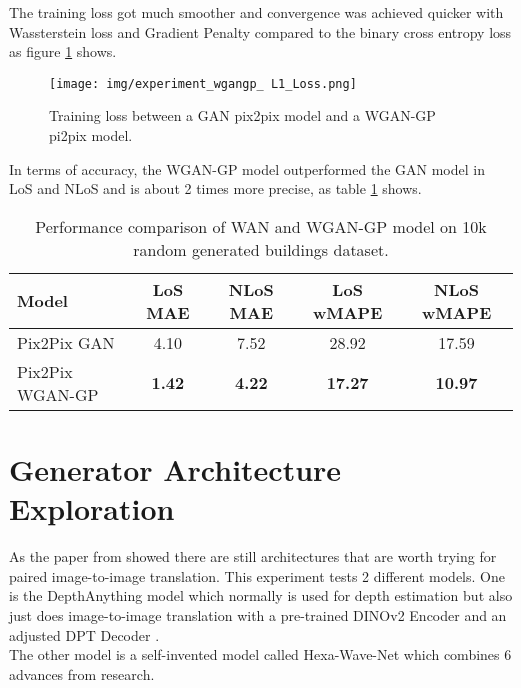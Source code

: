 		The training loss got much smoother and convergence was achieved quicker with Wassterstein loss and Gradient Penalty compared to the binary cross entropy loss as figure \ref{fig:experiment_wgangp_process} shows.
		\begin{figure}[H]
			\centering
			\texttt{[image: img/experiment\_wgangp\_ L1\_Loss.png]}
			\caption[Training loss between a GAN pix2pix model and a WGAN-GP pi2pix model.]{Training loss between a GAN pix2pix model and a WGAN-GP pi2pix model.}
			\label{fig:experiment_wgangp_process}
		\end{figure}
		\FloatBarrier
		
		In terms of accuracy, the WGAN-GP model outperformed the GAN model in LoS and NLoS and is about 2 times more precise, as table \ref{tab:performance_wgangp} shows.
		
		\begin{table}[h!]
			\centering
			\begin{tabular}{|l|c|c|c|c|}
				\hline
				\textbf{Model} & \textbf{LoS MAE} & \textbf{NLoS MAE} & \textbf{LoS wMAPE} & \textbf{NLoS wMAPE} \\
				\hline
				Pix2Pix GAN & 4.10 & 7.52 & 28.92 & 17.59 \\
				Pix2Pix WGAN-GP & \textbf{1.42} & \textbf{4.22} & \textbf{17.27} & \textbf{10.97} \\
				\hline
			\end{tabular}
			\caption{Performance comparison of WAN and WGAN-GP model on 10k random generated buildings dataset.}
			\label{tab:performance_wgangp}
		\end{table}
		
	\section{Generator Architecture Exploration}
	\label{sec:experiments-generator_architecture_exploration}
		As the paper from \citeauthor{achim_eckerle_evaluierung_2025} showed there are still architectures that are worth trying for paired image-to-image translation. This experiment tests 2 different models. One is the DepthAnything model \cite{yang2024depthv2} which normally is used for depth estimation but also just does image-to-image translation with a pre-trained DINOv2 Encoder \cite{oquab2024dinov2learningrobustvisual} and an adjusted DPT Decoder \cite{ranftl2021visiontransformersdenseprediction}.\\
		The other model is a self-invented model called Hexa-Wave-Net which combines 6 advances from research.
		
